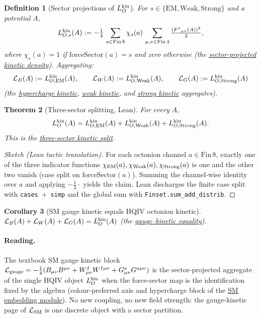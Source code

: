 \documentclass[11pt]{amsart}
\newtheorem{theorem}{Theorem}[section]
\newtheorem{definition}[theorem]{Definition}
\newtheorem{corollary}[theorem]{Corollary}
\begin{document}
\begin{definition}[Sector projections of $L_O^{\rm kin}$]
\label{def:LSM-kin}
For $s\in\{\text{EM},\text{Weak},\text{Strong}\}$ and a potential $A$,
\[
L^{\rm kin}_{O,s}(A)
:= -\tfrac14\,\sum_{a\in\mathrm{Fin}\,8} \chi_s(a)\,
\sum_{\mu,\nu\in\mathrm{Fin}\,4}\tfrac{(F^a{}_{\mu\nu}(A))^2}{2},
\]
where $\chi_s(a)=1$ if $\mathrm{forceSector}(a)=s$ and zero otherwise (the
\hyperref[lean:LO-kin-sector]{sector-projected kinetic density}). Aggregating:
\[
\mathcal{L}_B(A) := L^{\rm kin}_{O,{\rm EM}}(A),\qquad
\mathcal{L}_W(A) := L^{\rm kin}_{O,{\rm Weak}}(A),\qquad
\mathcal{L}_G(A) := L^{\rm kin}_{O,{\rm Strong}}(A)
\]
(the \hyperref[lean:LSM-B-kin]{hypercharge kinetic},
\hyperref[lean:LSM-W-kin]{weak kinetic}, and
\hyperref[lean:LSM-G-kin]{strong kinetic} aggregates).
\end{definition}

\begin{theorem}[Three-sector splitting, Lean]
\label{thm:sector-split}
For every $A$,
\[
L_O^{\rm kin}(A)
= L^{\rm kin}_{O,{\rm EM}}(A) + L^{\rm kin}_{O,{\rm Weak}}(A) + L^{\rm kin}_{O,{\rm Strong}}(A) .
\]
This is the \hyperref[lean:LO-kinetic-split]{three-sector kinetic split}.
\end{theorem}

\begin{proof}[Sketch (Lean tactic translation)]
For each octonion channel $a\in\mathrm{Fin}\,8$, exactly one of the three
indicator functions $\chi_{\rm EM}(a), \chi_{\rm Weak}(a), \chi_{\rm Strong}(a)$
is one and the other two vanish (case split on $\mathrm{forceSector}(a)$).
Summing the channel-wise identity over $a$ and applying $-\tfrac14\cdot$
yields the claim. Lean discharges the finite case split with
\texttt{cases}~$+$~\texttt{simp} and the global sum with
\texttt{Finset.sum\_add\_distrib}.
\end{proof}

\begin{corollary}[SM gauge kinetic equals HQIV octonion kinetic]
\label{cor:gauge-aggregate}
$\mathcal{L}_B(A)+\mathcal{L}_W(A)+\mathcal{L}_G(A)=L_O^{\rm kin}(A)$
(the \hyperref[lean:gauge-eq-kin]{gauge--kinetic equality}).
\end{corollary}

\paragraph{Reading.}
The textbook SM gauge kinetic block
$\mathcal{L}_{\rm gauge}=-\tfrac14(B_{\mu\nu}B^{\mu\nu}+W^I_{\mu\nu}W^{I\mu\nu}
+G^a_{\mu\nu}G^{a\mu\nu})$ is the sector-projected aggregate of the single
HQIV object $L_O^{\rm kin}$ when the force-sector map is the identification
fixed by the algebra (colour-preferred axis and hypercharge block of the
\hyperref[lean:sm-embedding]{SM embedding module}). No new coupling, no new
field strength: the gauge-kinetic page of $\mathcal{L}_{\rm SM}$ is one
discrete object with a sector partition.
\end{document}
